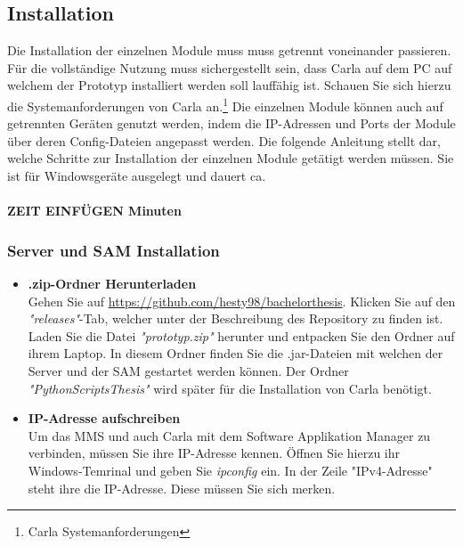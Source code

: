 \subsection{Installation}
Die Installation der einzelnen Module muss muss getrennt voneinander passieren. Für die vollständige Nutzung muss sichergestellt sein, dass Carla auf dem PC auf welchem der Prototyp installiert werden soll lauffähig ist. Schauen Sie sich hierzu die Systemanforderungen von Carla an.\footnote{Carla Systemanforderungen} Die einzelnen Module können auch auf getrennten Geräten genutzt werden, indem die IP-Adressen und Ports der Module über deren Config-Dateien angepasst werden. Die folgende Anleitung stellt dar, welche Schritte zur Installation der einzelnen Module getätigt werden müssen. Sie ist für Windowsgeräte ausgelegt und dauert ca. \\
\\
\textbf{ZEIT EINFÜGEN Minuten}


\subsubsection{Server und SAM Installation}
\begin{itemize}
	\item[\textbf{1.}] \textbf{.zip-Ordner Herunterladen}\\
	Gehen Sie auf \url{https://github.com/hesty98/bachelorthesis}. Klicken Sie auf den \textit{"releases"}-Tab, welcher unter der Beschreibung des Repository zu finden ist.
	Laden Sie die Datei \textit{"prototyp.zip"} herunter und entpacken Sie den Ordner auf ihrem Laptop. In diesem Ordner finden Sie die .jar-Dateien mit welchen der Server und der SAM gestartet werden können. Der Ordner \textit{"PythonScriptsThesis"} wird später für die Installation von Carla benötigt.
	
	\item[\textbf{2.}] \textbf{IP-Adresse aufschreiben}\\
	Um das MMS und auch Carla mit dem Software Applikation Manager zu verbinden, müssen Sie ihre IP-Adresse kennen. Öffnen Sie hierzu ihr Windows-Temrinal und geben Sie \textit{ipconfig} ein. In der Zeile "IPv4-Adresse" steht ihre die IP-Adresse. Diese müssen Sie sich merken.
\end{itemize}



